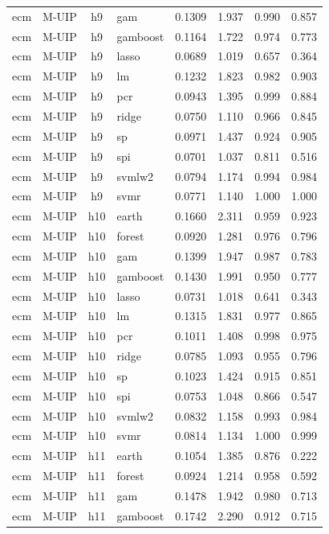 \begin{ThreePartTable}
\begin{longtable}[t]{llclcccc}
ecm & M-UIP & h9 & gam & 0.1309 & 1.937 & 0.990 & 0.857\\
ecm & M-UIP & h9 & gamboost & 0.1164 & 1.722 & 0.974 & 0.773\\
ecm & M-UIP & h9 & lasso & 0.0689 & 1.019 & 0.657 & 0.364\\
ecm & M-UIP & h9 & lm & 0.1232 & 1.823 & 0.982 & 0.903\\
ecm & M-UIP & h9 & pcr & 0.0943 & 1.395 & 0.999 & 0.884\\
ecm & M-UIP & h9 & ridge & 0.0750 & 1.110 & 0.966 & 0.845\\
ecm & M-UIP & h9 & sp & 0.0971 & 1.437 & 0.924 & 0.905\\
ecm & M-UIP & h9 & spi & 0.0701 & 1.037 & 0.811 & 0.516\\
ecm & M-UIP & h9 & svmlw2 & 0.0794 & 1.174 & 0.994 & 0.984\\
ecm & M-UIP & h9 & svmr & 0.0771 & 1.140 & 1.000 & 1.000\\
\addlinespace
ecm & M-UIP & h10 & earth & 0.1660 & 2.311 & 0.959 & 0.923\\
ecm & M-UIP & h10 & forest & 0.0920 & 1.281 & 0.976 & 0.796\\
ecm & M-UIP & h10 & gam & 0.1399 & 1.947 & 0.987 & 0.783\\
ecm & M-UIP & h10 & gamboost & 0.1430 & 1.991 & 0.950 & 0.777\\
ecm & M-UIP & h10 & lasso & 0.0731 & 1.018 & 0.641 & 0.343\\
ecm & M-UIP & h10 & lm & 0.1315 & 1.831 & 0.977 & 0.865\\
ecm & M-UIP & h10 & pcr & 0.1011 & 1.408 & 0.998 & 0.975\\
ecm & M-UIP & h10 & ridge & 0.0785 & 1.093 & 0.955 & 0.796\\
ecm & M-UIP & h10 & sp & 0.1023 & 1.424 & 0.915 & 0.851\\
ecm & M-UIP & h10 & spi & 0.0753 & 1.048 & 0.866 & 0.547\\
ecm & M-UIP & h10 & svmlw2 & 0.0832 & 1.158 & 0.993 & 0.984\\
ecm & M-UIP & h10 & svmr & 0.0814 & 1.134 & 1.000 & 0.999\\
\addlinespace
ecm & M-UIP & h11 & earth & 0.1054 & 1.385 & 0.876 & 0.222\\
ecm & M-UIP & h11 & forest & 0.0924 & 1.214 & 0.958 & 0.592\\
ecm & M-UIP & h11 & gam & 0.1478 & 1.942 & 0.980 & 0.713\\
ecm & M-UIP & h11 & gamboost & 0.1742 & 2.290 & 0.912 & 0.715\\

\end{longtable}
\end{ThreePartTable}
